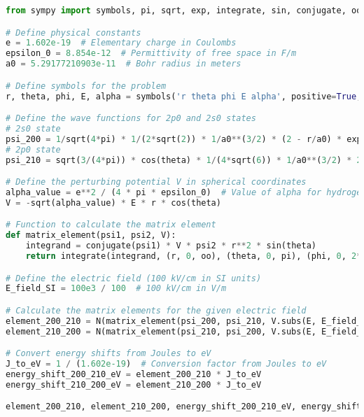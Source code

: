 \documentclass[12pt]{article}
\begin{document}
\begin{lstlisting}[language=Python]
from sympy import symbols, pi, sqrt, exp, integrate, sin, conjugate, oo, cos, N

# Define physical constants
e = 1.602e-19  # Elementary charge in Coulombs
epsilon_0 = 8.854e-12  # Permittivity of free space in F/m
a0 = 5.29177210903e-11  # Bohr radius in meters

# Define symbols for the problem
r, theta, phi, E, alpha = symbols('r theta phi E alpha', positive=True, real=True)

# Define the wave functions for 2p0 and 2s0 states
# 2s0 state
psi_200 = 1/sqrt(4*pi) * 1/(2*sqrt(2)) * 1/a0**(3/2) * (2 - r/a0) * exp(-r/(2*a0))
# 2p0 state
psi_210 = sqrt(3/(4*pi)) * cos(theta) * 1/(4*sqrt(6)) * 1/a0**(3/2) * 2 * (r/a0) * exp(-r/(2*a0))

# Define the perturbing potential V in spherical coordinates
alpha_value = e**2 / (4 * pi * epsilon_0)  # Value of alpha for hydrogen atom
V = -sqrt(alpha_value) * E * r * cos(theta)

# Function to calculate the matrix element
def matrix_element(psi1, psi2, V):
    integrand = conjugate(psi1) * V * psi2 * r**2 * sin(theta)
    return integrate(integrand, (r, 0, oo), (theta, 0, pi), (phi, 0, 2*pi))

# Define the electric field (100 kV/cm in SI units)
E_field_SI = 100e3 / 100  # 100 kV/cm in V/m

# Calculate the matrix elements for the given electric field
element_200_210 = N(matrix_element(psi_200, psi_210, V.subs(E, E_field_SI)))
element_210_200 = N(matrix_element(psi_210, psi_200, V.subs(E, E_field_SI)))

# Convert energy shifts from Joules to eV
J_to_eV = 1 / (1.602e-19)  # Conversion factor from Joules to eV
energy_shift_200_210_eV = element_200_210 * J_to_eV
energy_shift_210_200_eV = element_210_200 * J_to_eV

element_200_210, element_210_200, energy_shift_200_210_eV, energy_shift_210_200_eV


\end{lstlisting}
\end{document}

